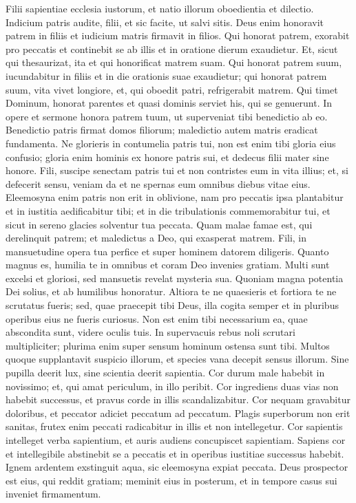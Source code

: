 \begin{biblechapter}
\begin{biblechapter}
\begin{biblechapter}
\verse Filii sapientiae ecclesia iustorum,
 et natio illorum oboedientia et dilectio.
 \verse Indicium patris audite, filii,
 et sic facite, ut salvi sitis.
 \verse Deus enim honoravit patrem in filiis
 et iudicium matris firmavit in filios.
 \verse Qui honorat patrem, exorabit pro peccatis
 et continebit se ab illis
 et in oratione dierum exaudietur.
 \verse Et, sicut qui thesaurizat,
 ita et qui honorificat matrem suam.
 \verse Qui honorat patrem suum, iucundabitur in filiis
 et in die orationis suae exaudietur;
 \verse qui honorat patrem suum, vita vivet longiore,
 et, qui oboedit patri, refrigerabit matrem.
 \verse Qui timet Dominum, honorat parentes
 et quasi dominis serviet his, qui se genuerunt.
 \verse In opere et sermone honora patrem tuum,
 \verse ut superveniat tibi benedictio ab eo.
 \verse Benedictio patris firmat domos filiorum;
 maledictio autem matris eradicat fundamenta.
 \verse Ne glorieris in contumelia patris tui,
 non est enim tibi gloria eius confusio;
 \verse gloria enim hominis ex honore patris sui,
 et dedecus filii mater sine honore.
 \verse Fili, suscipe senectam patris tui
 et non contristes eum in vita illius;
 \verse et, si defecerit sensu, veniam da
 et ne spernas eum omnibus diebus vitae eius.
 Eleemosyna enim patris non erit in oblivione,
 \verse nam pro peccatis ipsa plantabitur
 \verse et in iustitia aedificabitur tibi;
 et in die tribulationis commemorabitur tui,
 et sicut in sereno glacies solventur tua peccata.
 \verse Quam malae famae est, qui derelinquit patrem;
 et maledictus a Deo, qui exasperat matrem.
 \verse Fili, in mansuetudine opera tua perfice
 et super hominem datorem diligeris.
 \verse Quanto magnus es, humilia te in omnibus
 et coram Deo invenies gratiam.
 Multi sunt excelsi et gloriosi,
 sed mansuetis revelat mysteria sua.
 \verse Quoniam magna potentia Dei solius,
 et ab humilibus honoratur.
 \verse Altiora te ne quaesieris
 et fortiora te ne scrutatus fueris;
 sed, quae praecepit tibi Deus, illa cogita semper
 et in pluribus operibus eius ne fueris curiosus.
 \verse Non est enim tibi necessarium
 ea, quae abscondita sunt, videre oculis tuis.
 \verse In supervacuis rebus noli scrutari multipliciter;
 \verse plurima enim super sensum hominum ostensa sunt tibi.
 \verse Multos quoque supplantavit suspicio illorum,
 et species vana decepit sensus illorum.
 Sine pupilla deerit lux,
 sine scientia deerit sapientia.
 \verse Cor durum male habebit in novissimo;
 et, qui amat periculum, in illo peribit.
 \verse Cor ingrediens duas vias non habebit successus,
 et pravus corde in illis scandalizabitur.
 \verse Cor nequam gravabitur doloribus,
 et peccator adiciet peccatum ad peccatum.
 \verse Plagis superborum non erit sanitas,
 frutex enim peccati radicabitur in illis et non intellegetur.
 \verse Cor sapientis intelleget verba sapientium,
 et auris audiens concupiscet sapientiam.
 \verse Sapiens cor et intellegibile abstinebit se a peccatis
 et in operibus iustitiae successus habebit.
 \verse Ignem ardentem exstinguit aqua,
 sic eleemosyna expiat peccata.
 \verse Deus prospector est eius, qui reddit gratiam;
 meminit eius in posterum,
 et in tempore casus sui inveniet firmamentum.
 

\end{biblechapter}
\end{biblechapter}
\end{biblechapter}
